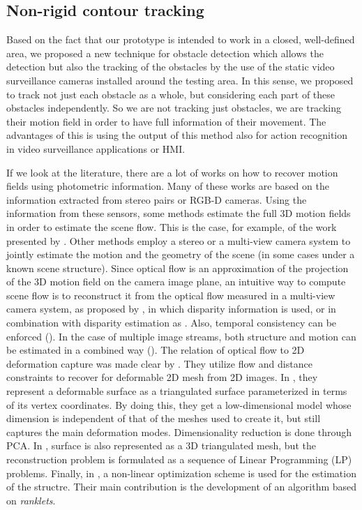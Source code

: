 \subsection{Non-rigid contour tracking}\label{ch:chapter00_02_02}

Based on the fact that our prototype is intended to work in a closed, well-defined area, we proposed a new technique for obstacle detection which allows the detection but also the tracking of the obstacles by the use of the static video surveillance cameras installed around the testing area. In this sense, we proposed to track not just each obstacle as a whole, but considering each part of these obstacles independently. So we are not tracking just obstacles, we are tracking their motion field in order to have full information of their movement. The advantages of this is using the output of this method also for action recognition in video surveillance applications or \ac{HMI}.

If we look at the literature, there are a lot of works on how to recover motion fields using photometric information. Many of these works are based on the information extracted from stereo  pairs or RGB-D cameras. Using the information from these sensors, some methods estimate the full 3D motion fields in order to estimate the scene flow. This is the case, for example, of the work presented by \cite{vedula1999three}. Other methods employ a stereo or a multi-view camera system to jointly estimate the motion and the geometry of the scene (in some cases under a known scene structure). Since optical flow is an approximation of the projection of the 3D motion field on the camera image plane, an intuitive way to compute scene flow is to reconstruct it from the optical flow measured in a multi-view camera system, as proposed by \cite{vedula2005three}, in which disparity information is used, or in combination with disparity estimation as \cite{huguet2007variational, li2008multi, zhang20013d}. Also, temporal consistency can be enforced (\cite{rabe2010dense}). In the case of multiple image streams, both structure and motion can be estimated in a combined way (\cite{pons2007multi, basha2013multi}). The relation of optical flow to 2D deformation capture was made clear by \cite{hilsmann2007deformable}. They utilize flow and distance constraints to recover for deformable 2D mesh from 2D images. In \cite{salzmann2007surface}, they represent a deformable surface as a triangulated surface parameterized in terms of its vertex coordinates. By doing this, they get a low-dimensional model whose dimension is independent of that of the meshes used to create it, but still captures the main deformation modes. Dimensionality reduction is done through \ac{PCA}. In \cite{wang2010monocular}, surface is also represented as a 3D triangulated mesh, but the reconstruction problem is formulated as a sequence of Linear Programming (LP) problems. Finally, in \cite{delbue2007nonrigid}, a non-linear optimization scheme is used for the estimation of the structre. Their main contribution is the development of an algorithm based on \emph{ranklets}.

